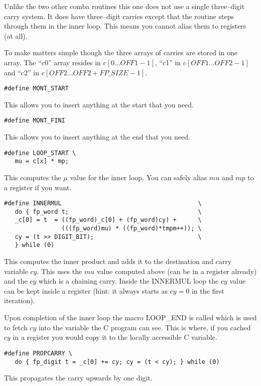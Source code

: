 \documentclass[b5paper]{book}
\begin{document}
Unlike the two other comba routines this one does not use a single three--digit carry 
system.  It does have three--digit carries except that the routine steps through them
in the inner loop.  This means you cannot alias them to registers (at all).

To make matters simple though the three arrays of carries are stored in one array.  The 
``c0'' array resides in $c[0 \ldots OFF1-1]$, ``c1'' in $c[OFF1 \ldots OFF2-1]$ and ``c2'' in
$c[OFF2 \ldots OFF2+FP\_SIZE-1]$.  

\begin{verbatim}
#define MONT_START 
\end{verbatim}

This allows you to insert anything at the start that you need.

\begin{verbatim}
#define MONT_FINI
\end{verbatim}

This allows you to insert anything at the end that you need.

\begin{verbatim}
#define LOOP_START \
   mu = c[x] * mp;
\end{verbatim}

This computes the $\mu$ value for the inner loop.  You can safely alias $mu$ and $mp$ to
a register if you want.

\begin{verbatim}
#define INNERMUL                                      \
   do { fp_word t;                                    \
   _c[0] = t  = ((fp_word)_c[0] + (fp_word)cy) +      \
                (((fp_word)mu) * ((fp_word)*tmpm++)); \
   cy = (t >> DIGIT_BIT);                             \
   } while (0)
\end{verbatim}

This computes the inner product and adds it to the destination and carry variable $cy$.
This uses the $mu$ value computed above (can be in a register already) and the 
$cy$ which is a chaining carry.  Inside the INNERMUL loop the $cy$ value can be kept
inside a register (hint: it always starts as $cy = 0$ in the first iteration).

Upon completion of the inner loop the macro LOOP\_END is called which is used to fetch
$cy$ into the variable the C program can see.  This is where, if you cached $cy$ in a
register you would copy it to the locally accessible C variable.

\begin{verbatim}
#define PROPCARRY \
   do { fp_digit t = _c[0] += cy; cy = (t < cy); } while (0)
\end{verbatim}

This propagates the carry upwards by one digit.  


\end{document}
